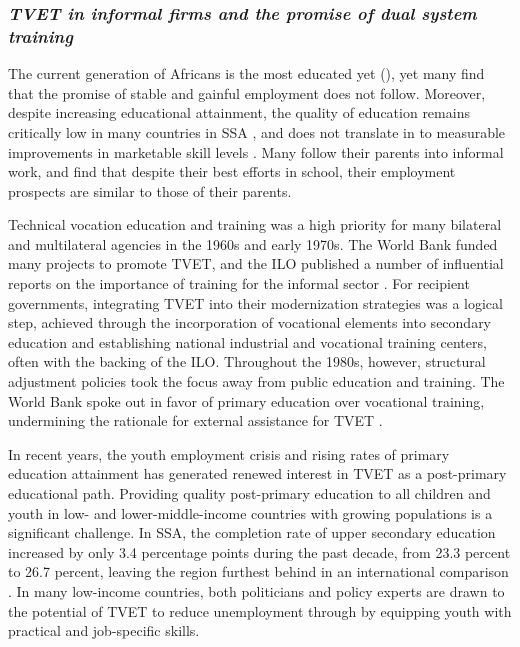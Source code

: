 \documentclass[
  a4paper, twoside, 12pt]{book}
\begin{document}
\hypertarget{tvet-in-informal-firms-and-the-promise-of-dual-system-training}{%
\subsubsection*{\texorpdfstring{\emph{TVET in informal firms and the promise of dual system training}}{TVET in informal firms and the promise of dual system training}}\label{tvet-in-informal-firms-and-the-promise-of-dual-system-training}}

The current generation of Africans is the most educated yet (\textcite{filmer2014}), yet many find that the promise of stable and gainful employment does not follow. Moreover, despite increasing educational attainment, the quality of education remains critically low in many countries in SSA \autocite{worldbank2018}, and does not translate in to measurable improvements in marketable skill levels \autocite{filmer2020}. Many follow their parents into informal work, and find that despite their best efforts in school, their employment prospects are similar to those of their parents.

Technical vocation education and training was a high priority for many bilateral and multilateral agencies in the 1960s and early 1970s. The World Bank funded many projects to promote TVET, and the ILO published a number of influential reports on the importance of training for the informal sector \autocite{palmer2007}. For recipient governments, integrating TVET into their modernization strategies was a logical step, achieved through the incorporation of vocational elements into secondary education and establishing national industrial and vocational training centers, often with the backing of the ILO. Throughout the 1980s, however, structural adjustment policies took the focus away from public education and training. The World Bank spoke out in favor of primary education over vocational training, undermining the rationale for external assistance for TVET \autocite{king2007}.

In recent years, the youth employment crisis and rising rates of primary education attainment has generated renewed interest in TVET as a post-primary educational path. Providing quality post-primary education to all children and youth in low- and lower-middle-income countries with growing populations is a significant challenge. In SSA, the completion rate of upper secondary education increased by only 3.4 percentage points during the past decade, from 23.3 percent to 26.7 percent, leaving the region furthest behind in an international comparison \autocite{un2022}. In many low-income countries, both politicians and policy experts are drawn to the potential of TVET to reduce unemployment through by equipping youth with practical and job-specific skills.
\end{document}
